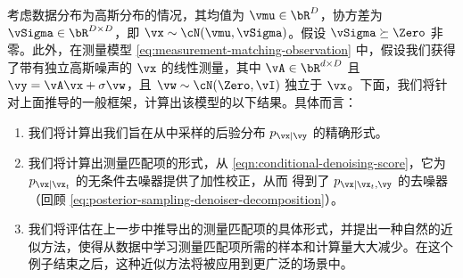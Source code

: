 \documentclass[../../book-main_zh.tex]{subfiles}
\begin{document}
\begin{example}\label{example:denoising-conditional-gaussian}
    考虑数据分布为高斯分布的情况，其均值为 $\vmu \in
    \bR^D$，协方差为 $\vSigma \in \bR^{D \times D}$，即 $\vx \sim
    \cN(\vmu, \vSigma)$。假设 $\vSigma \succeq \Zero$ 非零。此外，在测量模型 \eqref{eq:measurement-matching-observation} 中，假设我们获得了带有独立高斯噪声的 $\vx$ 的线性测量，其中 $\vA \in \bR^{d \times D}$ 且 $\vy = \vA \vx + \sigma \vw$，且 $\vw \sim \cN(\Zero, \vI)$ 独立于 $\vx$。下面，我们将针对上面推导的一般框架，计算出该模型的以下结果。具体而言：
    \begin{enumerate}
        \item 我们将计算出我们旨在从中采样的后验分布 $p_{\vx \mid \vy}$ 的精确形式。
        \item 我们将计算出测量匹配项的形式，从
            \eqref{eqn:conditional-denoising-score}，它为 $p_{\vx \mid
            \vx_t}$ 的无条件去噪器提供了加性校正，从而
            得到了 $p_{\vx \mid \vx_t, \vy}$ 的去噪器（回顾
            \eqref{eq:posterior-sampling-denoiser-decomposition}）。
        \item 我们将评估在上一步中推导出的测量匹配项的具体形式，并提出一种自然的近似方法，使得从数据中学习测量匹配项所需的样本和计算量大大减少。在这个例子结束之后，这种近似方法将被应用到更广泛的场景中。
    \end{enumerate}


\end{example}
\end{document}

